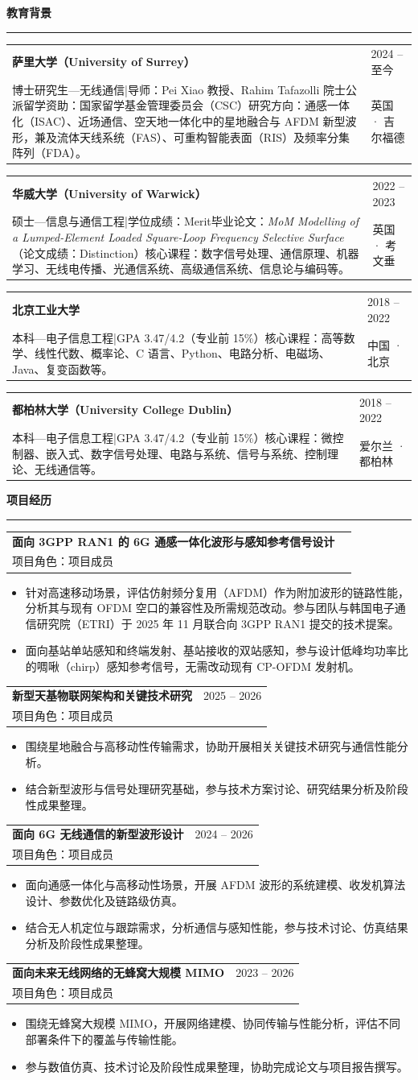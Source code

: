 \documentclass[10.5pt,a4paper,fontset=fandol]{ctexart}
\makeatletter
\newcommand{\ressection}[1]{%
  \needspace{3\baselineskip}\vspace{.55em}%
  {\zihao{4}\bfseries #1}\par\vspace{-.45em}%
  \noindent\rule{\textwidth}{0.45pt}\vspace{.30em}}
\newcommand{\entry}[4]{%
  \begin{tabularx}{\textwidth}{@{}>{\raggedright\arraybackslash}X>{\raggedleft\arraybackslash}p{3.8cm}@{}}
    \textbf{#1} & {\color{gray}#2}\\[-.08em]
    #3 & {\color{gray}#4}
  \end{tabularx}\vspace{.18em}}
\newcommand{\project}[4]{%
  \begin{tabularx}{\textwidth}{@{}>{\raggedright\arraybackslash}X>{\raggedleft\arraybackslash}p{2.7cm}@{}}
    \textbf{#1} & {\color{gray}#2}\\[-.1em]
    #3 &
  \end{tabularx}
  \begin{itemize}[leftmargin=1.45em,topsep=.05em,itemsep=.05em]
    #4
  \end{itemize}\vspace{.12em}}
\makeatother
\begin{document}
\ressection{教育背景}
\entry{萨里大学（University of Surrey）}{2024 -- 至今}{博士研究生—无线通信\quad|\quad 导师：Pei Xiao 教授、Rahim Tafazolli 院士\newline 公派留学资助：国家留学基金管理委员会（CSC）\newline 研究方向：通感一体化（ISAC）、近场通信、空天地一体化中的星地融合与 AFDM 新型波形，兼及流体天线系统（FAS）、可重构智能表面（RIS）及频率分集阵列（FDA）。}{英国 · 吉尔福德}
\entry{华威大学（University of Warwick）}{2022 -- 2023}{硕士—信息与通信工程\quad|\quad 学位成绩：Merit\newline 毕业论文：\textit{MoM Modelling of a Lumped-Element Loaded Square-Loop Frequency Selective Surface}（论文成绩：Distinction）\newline 核心课程：数字信号处理、通信原理、机器学习、无线电传播、光通信系统、高级通信系统、信息论与编码等。}{英国 · 考文垂}
\entry{北京工业大学}{2018 -- 2022}{本科—电子信息工程\quad|\quad GPA 3.47/4.2（专业前 15\%）\newline 核心课程：高等数学、线性代数、概率论、C 语言、Python、电路分析、电磁场、Java、复变函数等。}{中国 · 北京}
\entry{都柏林大学（University College Dublin）}{2018 -- 2022}{本科—电子信息工程\quad|\quad GPA 3.47/4.2（专业前 15\%）\newline 核心课程：微控制器、嵌入式、数字信号处理、电路与系统、信号与系统、控制理论、无线通信等。}{爱尔兰 · 都柏林}

\ressection{项目经历}
\project{面向 3GPP RAN1 的 6G 通感一体化波形与感知参考信号设计}{}{项目角色：项目成员}{
  \item 针对高速移动场景，评估仿射频分复用（AFDM）作为附加波形的链路性能，分析其与现有 OFDM 空口的兼容性及所需规范改动。参与团队与韩国电子通信研究院（ETRI）于 2025 年 11 月联合向 3GPP RAN1 提交的技术提案。
  \item 面向基站单站感知和终端发射、基站接收的双站感知，参与设计低峰均功率比的啁啾（chirp）感知参考信号，无需改动现有 CP-OFDM 发射机。}
\project{新型天基物联网架构和关键技术研究}{2025 -- 2026}{项目角色：项目成员}{
  \item 围绕星地融合与高移动性传输需求，协助开展相关关键技术研究与通信性能分析。
  \item 结合新型波形与信号处理研究基础，参与技术方案讨论、研究结果分析及阶段性成果整理。}
\project{面向 6G 无线通信的新型波形设计}{2024 -- 2026}{项目角色：项目成员}{
  \item 面向通感一体化与高移动性场景，开展 AFDM 波形的系统建模、收发机算法设计、参数优化及链路级仿真。
  \item 结合无人机定位与跟踪需求，分析通信与感知性能，参与技术讨论、仿真结果分析及阶段性成果整理。}
\project{面向未来无线网络的无蜂窝大规模 MIMO}{2023 -- 2026}{项目角色：项目成员}{
  \item 围绕无蜂窝大规模 MIMO，开展网络建模、协同传输与性能分析，评估不同部署条件下的覆盖与传输性能。
  \item 参与数值仿真、技术讨论及阶段性成果整理，协助完成论文与项目报告撰写。}
\end{document}
